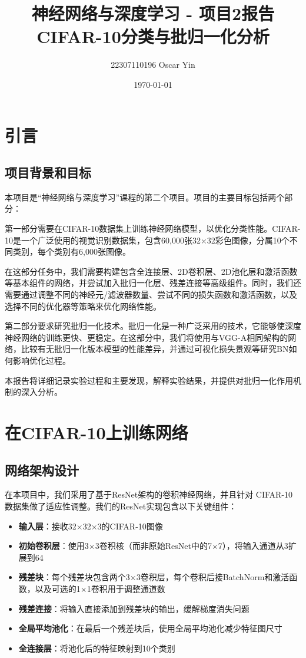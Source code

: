 \documentclass[12pt,a4paper]{article}
\title{神经网络与深度学习 - 项目2报告\\CIFAR-10分类与批归一化分析}
\author{22307110196 Oscar Yin}
\date{\today}
\begin{document}
\maketitle
\tableofcontents
\newpage

\section{引言}
\subsection{项目背景和目标}
本项目是“神经网络与深度学习”课程的第二个项目。项目的主要目标包括两个部分：

第一部分需要在CIFAR-10数据集上训练神经网络模型，以优化分类性能。CIFAR-10是一个广泛使用的视觉识别数据集，包含60,000张32×32彩色图像，分属10个不同类别，每个类别有6,000张图像。

在这部分任务中，我们需要构建包含全连接层、2D卷积层、2D池化层和激活函数等基本组件的网络，并尝试加入批归一化层、残差连接等高级组件。同时，我们还需要通过调整不同的神经元/滤波器数量、尝试不同的损失函数和激活函数，以及选择不同的优化器等策略来优化网络性能。

第二部分要求研究批归一化技术。批归一化是一种广泛采用的技术，它能够使深度神经网络的训练更快、更稳定。在这部分中，我们将使用与VGG-A相同架构的网络，比较有无批归一化版本模型的性能差异，并通过可视化损失景观等研究BN如何影响优化过程。

本报告将详细记录实验过程和主要发现，解释实验结果，并提供对批归一化作用机制的深入分析。

\section{在CIFAR-10上训练网络}

\subsection{网络架构设计}

在本项目中，我们采用了基于ResNet架构的卷积神经网络，并且针对 CIFAR-10 数据集做了适应性调整。我们的ResNet实现包含以下关键组件：

\begin{itemize}
    \item \textbf{输入层}：接收32×32×3的CIFAR-10图像
    \item \textbf{初始卷积层}：使用3×3卷积核（而非原始ResNet中的7×7），将输入通道从3扩展到64
    \item \textbf{残差块}：每个残差块包含两个3×3卷积层，每个卷积后接BatchNorm和激活函数，以及可选的1×1卷积用于调整通道数
    \item \textbf{残差连接}：将输入直接添加到残差块的输出，缓解梯度消失问题
    \item \textbf{全局平均池化}：在最后一个残差块后，使用全局平均池化减少特征图尺寸
    \item \textbf{全连接层}：将池化后的特征映射到10个类别
\end{itemize}
\end{document}
